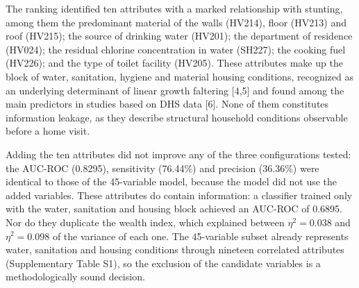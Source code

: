 \documentclass[11pt]{article}
\begin{document}
The ranking identified ten attributes with a marked relationship with stunting, among them the predominant material of
the walls (HV214), floor (HV213) and roof (HV215); the source of drinking water (HV201); the department of residence
(HV024); the residual chlorine concentration in water (SH227); the cooking fuel (HV226); and the type of toilet facility
(HV205). These attributes make up the block of water, sanitation, hygiene and material housing conditions, recognized as
an underlying determinant of linear growth faltering [4,5] and found among the main predictors in studies based on DHS
data [6]. None of them constitutes information leakage, as they describe structural household conditions observable
before a home visit.

Adding the ten attributes did not improve any of the three configurations tested: the AUC-ROC (0.8295), sensitivity
(76.44\%) and precision (36.36\%) were identical to those of the 45-variable model, because the model did not use the
added variables. These attributes do contain information: a classifier trained only with the water, sanitation and
housing block achieved an AUC-ROC of 0.6895. Nor do they duplicate the wealth index, which explained between
$\eta^2 = 0.038$ and $\eta^2 = 0.098$ of the variance of each one. The 45-variable subset already represents water,
sanitation and housing conditions through nineteen correlated attributes (Supplementary Table S1), so the exclusion of
the candidate variables is a methodologically sound decision.
\end{document}
